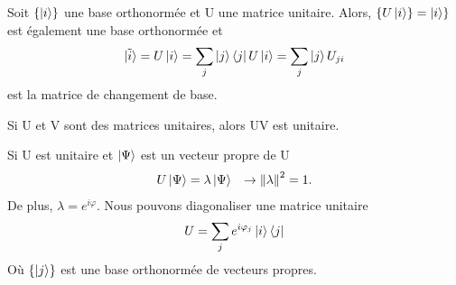 \documentclass[../notesdecours.tex]{subfiles}
\begin{document}
\begin{Property} 
Soit $\{\ket{i}\}$ une base orthonormée et U une matrice unitaire. Alors, $\{U\ket{i}\} = \ket{i}\}$ est également une base orthonormée et 
\begin{equation}
\ket{\tilde{i}} = U\ket{i} = \sum_j \ket{j}\bra{j}U\ket{i} = \sum_j \ket{j}U_{ji}
\end{equation}
est la matrice de changement de base.
\end{Property}

\begin{Property}
Si U et V sont des matrices unitaires, alors UV est unitaire. \end{Property}

\begin{Property} Si U est unitaire et $\ket{\Psi}$ est un vecteur propre de U
\begin{align}
U\ket{\Psi} &= \lambda\ket{\Psi}		&\rightarrow \norm{\lambda}^2 = 1.
\end{align}
De plus, $\lambda = e^{i\varphi}$. Nous pouvons diagonaliser une matrice unitaire 
\begin{equation}
U = \sum_j e^{i\varphi_j}\ket{i}\bra{j}
\end{equation}
Où $\{\ket{j}\}$ est une base orthonormée de vecteurs propres. \end{Property}
\end{document}
